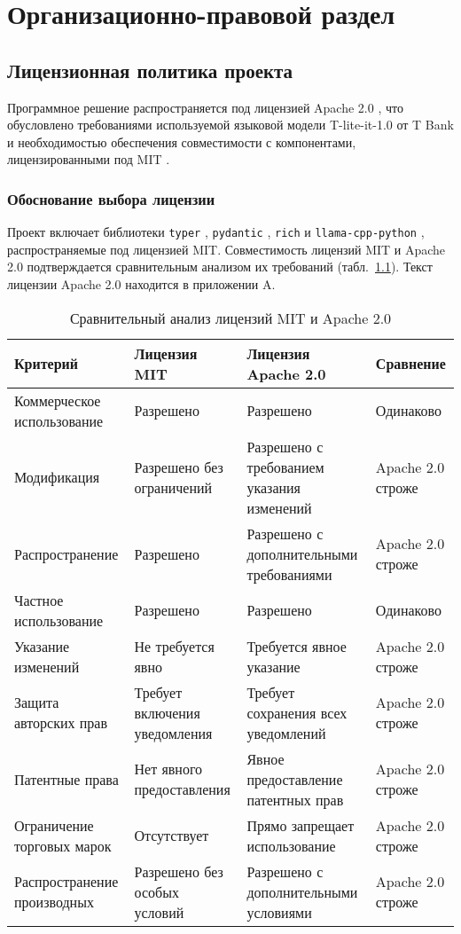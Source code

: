 \chapter{Организационно-правовой раздел}

\section{Лицензионная политика проекта}

Программное решение распространяется под лицензией Apache 2.0 \cite{apache}, что обусловлено требованиями используемой языковой модели T-lite-it-1.0 \cite{tlite} от T Bank и необходимостью обеспечения совместимости с компонентами, лицензированными под MIT \cite{mit}.

\subsection{Обоснование выбора лицензии}

Проект включает библиотеки \texttt{typer} \cite{typer}, \texttt{pydantic} \cite{pydantic}, \texttt{rich} \cite{rich} и \texttt{llama-cpp-python} \cite{llama-cpp-python}, распространяемые под лицензией MIT. Совместимость лицензий MIT и Apache 2.0 подтверждается сравнительным анализом их требований (табл.~\ref{tab:license-comparison}). Текст лицензии Apache 2.0 находится в приложении A.

\begin{table}[ht]
	\centering
	\caption{Сравнительный анализ лицензий MIT и Apache 2.0}
	\label{tab:license-comparison}
	\begin{tabular}{|p{4.5cm}|p{3.5cm}|p{3.5cm}|p{2.5cm}|}
		\hline
		\textbf{Критерий} & \textbf{Лицензия MIT} & \textbf{Лицензия Apache 2.0} & \textbf{Сравнение} \\
		\hline
		Коммерческое использование & Разрешено & Разрешено & Одинаково \\
		\hline
		Модификация & Разрешено без ограничений & Разрешено с требованием указания изменений & Apache 2.0 строже \\
		\hline
		Распространение & Разрешено & Разрешено с дополнительными требованиями & Apache 2.0 строже \\
		\hline
		Частное использование & Разрешено & Разрешено & Одинаково \\
		\hline
		Указание изменений & Не требуется явно & Требуется явное указание & Apache 2.0 строже \\
		\hline
		Защита авторских прав & Требует включения уведомления & Требует сохранения всех уведомлений & Apache 2.0 строже \\
		\hline
		Патентные права & Нет явного предоставления & Явное предоставление патентных прав & Apache 2.0 строже \\
		\hline
		Ограничение торговых марок & Отсутствует & Прямо запрещает использование & Apache 2.0 строже \\
		\hline
		Распространение производных & Разрешено без особых условий & Разрешено с дополнительными условиями & Apache 2.0 строже \\
		\hline
	\end{tabular}
\end{table}


